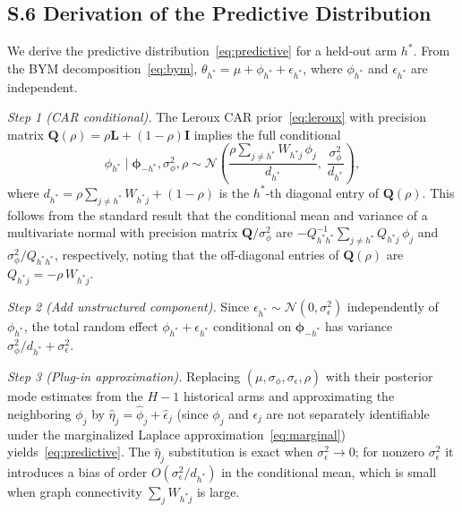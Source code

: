 \documentclass[12pt]{article}
\newcommand{\bphi}{\boldsymbol{\phi}}
\newcommand{\bL}{\mathbf{L}}
\newcommand{\bI}{\mathbf{I}}
\newcommand{\bQ}{\mathbf{Q}}
\begin{document}
\subsection*{S.6 Derivation of the Predictive Distribution}

We derive the predictive distribution~\eqref{eq:predictive} for a held-out arm $h^*$. From the BYM decomposition~\eqref{eq:bym}, $\theta_{h^*} = \mu + \phi_{h^*} + \epsilon_{h^*}$, where $\phi_{h^*}$ and $\epsilon_{h^*}$ are independent.

\textit{Step 1 (CAR conditional).} The Leroux CAR prior~\eqref{eq:leroux} with precision matrix $\bQ(\rho) = \rho \bL + (1-\rho)\bI$ implies the full conditional
\[
\phi_{h^*} \mid \bphi_{-h^*}, \sigma_\phi^2, \rho \sim \mathcal{N}\!\left(\frac{\rho \sum_{j \neq h^*} W_{h^* j}\, \phi_j}{d_{h^*}},\; \frac{\sigma_\phi^2}{d_{h^*}}\right),
\]
where $d_{h^*} = \rho \sum_{j \neq h^*} W_{h^* j} + (1-\rho)$ is the $h^*$-th diagonal entry of $\bQ(\rho)$. This follows from the standard result that the conditional mean and variance of a multivariate normal with precision matrix $\bQ / \sigma_\phi^2$ are $-Q_{h^* h^*}^{-1} \sum_{j \neq h^*} Q_{h^* j}\, \phi_j$ and $\sigma_\phi^2 / Q_{h^* h^*}$, respectively, noting that the off-diagonal entries of $\bQ(\rho)$ are $Q_{h^* j} = -\rho\, W_{h^* j}$.

\textit{Step 2 (Add unstructured component).} Since $\epsilon_{h^*} \sim \mathcal{N}(0, \sigma_\epsilon^2)$ independently of $\phi_{h^*}$, the total random effect $\phi_{h^*} + \epsilon_{h^*}$ conditional on $\bphi_{-h^*}$ has variance $\sigma_\phi^2 / d_{h^*} + \sigma_\epsilon^2$.

\textit{Step 3 (Plug-in approximation).} Replacing $(\mu, \sigma_\phi, \sigma_\epsilon, \rho)$ with their posterior mode estimates from the $H-1$ historical arms and approximating the neighboring $\phi_j$ by $\hat{\eta}_j = \hat{\phi}_j + \hat{\epsilon}_j$ (since $\phi_j$ and $\epsilon_j$ are not separately identifiable under the marginalized Laplace approximation~\eqref{eq:marginal}) yields~\eqref{eq:predictive}. The $\hat{\eta}_j$ substitution is exact when $\sigma_\epsilon^2 \to 0$; for nonzero $\sigma_\epsilon^2$ it introduces a bias of order $O(\sigma_\epsilon^2 / d_{h^*})$ in the conditional mean, which is small when graph connectivity $\sum_j W_{h^*j}$ is large.
\end{document}
